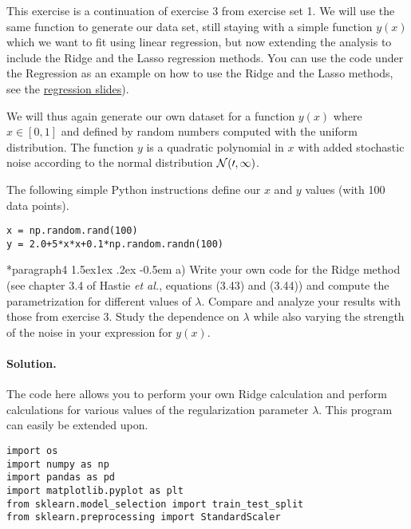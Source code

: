 \documentclass[%
oneside,                 %
final,                   %
10pt]{article}
\makeatletter
\newenvironment{doconceexercise}{}{}
\newcounter{doconceexercisecounter}
\newcommand\subex{\@startsection*{paragraph}{4}{\z@}%
                  {1.5ex\@plus1ex \@minus.2ex}%
                  {-0.5em}%
                  {\normalfont\normalsize\bfseries}}
\makeatother
\begin{document}
\begin{doconceexercise}

                             

This exercise is a continuation of exercise 3 from exercise set 1. We will
use the same function to generate our data set, still staying with a
simple function $y(x)$ which we want to fit using linear regression,
but now extending the analysis to include the Ridge and the Lasso
regression methods. You can use the code under the Regression as an example on how to use the Ridge and the Lasso methods, see the \href{{https://compphysics.github.io/MachineLearning/doc/pub/Regression/html/Regression-bs.html}}{regression slides}). 

We will thus again generate our own dataset for a function $y(x)$ where 
$x \in [0,1]$ and defined by random numbers computed with the uniform
distribution. The function $y$ is a quadratic polynomial in $x$ with
added stochastic noise according to the normal distribution $\cal{N}(0,1)$.

The following simple Python instructions define our $x$ and $y$ values (with 100 data points).
\begin{verbatim}
x = np.random.rand(100)
y = 2.0+5*x*x+0.1*np.random.randn(100)
\end{verbatim}


\subex{a)}
Write your own code for the Ridge method (see chapter 3.4 of Hastie \emph{et al.}, equations (3.43) and (3.44)) and compute the parametrization for different values of $\lambda$. Compare and analyze your results with those from exercise 3. Study the dependence on $\lambda$ while also varying the strength of the noise in your expression for $y(x)$.


\paragraph{Solution.}
The code here allows you to perform your own Ridge calculation and perform calculations for various values of the regularization parameter $\lambda$. This program can easily be extended upon.
\begin{verbatim}
import os
import numpy as np
import pandas as pd
import matplotlib.pyplot as plt
from sklearn.model_selection import train_test_split
from sklearn.preprocessing import StandardScaler


\end{verbatim}
\end{doconceexercise}
\end{document}
